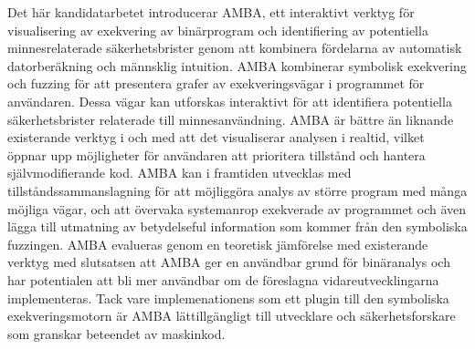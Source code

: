 Det här kandidatarbetet introducerar AMBA, ett interaktivt verktyg för
visualisering av exekvering av binärprogram och identifiering av
potentiella minnesrelaterade säkerhetsbrister genom att kombinera
fördelarna av automatisk datorberäkning och männsklig intuition.  AMBA
kombinerar symbolisk exekvering och fuzzing för att presentera grafer
av exekveringsvägar i programmet för användaren. Dessa vägar kan
utforskas interaktivt för att identifiera potentiella säkerhetsbrister
relaterade till minnesanvändning. AMBA är bättre än liknande
existerande verktyg i och med att det visualiserar analysen i realtid,
vilket öppnar upp möjligheter för användaren att prioritera tillstånd
och hantera självmodifierande kod. AMBA kan i framtiden utvecklas med
tillståndssammanslagning för att möjliggöra analys av större program
med många möjliga vägar, och att övervaka systemanrop exekverade av
programmet och även lägga till utmatning av betydelseful information
som kommer från den symboliska fuzzingen. AMBA evalueras genom en
teoretisk jämförelse med existerande verktyg med slutsatsen att AMBA
ger en användbar grund för binäranalys och har potentialen att bli mer
användbar om de föreslagna vidareutvecklingarna implementeras.  Tack
vare implemenationens som ett plugin till den symboliska
exekveringsmotorn \stoe{} är AMBA lättillgängligt till utvecklare och
säkerhetsforskare som granskar beteendet av maskinkod.
